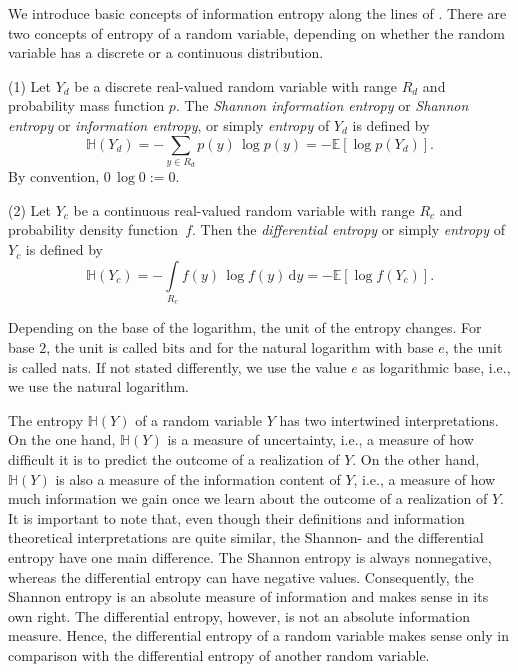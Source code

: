 \documentclass[smallextended]{svjour3}
\newcommand{\E}{\mathbb{E}}
\renewcommand{\H}{\mathbb{H}}
\newcommand{\suml}{\sum\limits}
\newcommand{\intl}{\int\limits}
\newcommand{\dd}[1]{\,\mathrm{d}#1}
\newcommand{\bits}{\mathrm{bits}}
\newcommand{\nats}{\mathrm{nats}}
\newcommand{\ie}{i.e.}
\newcommand{\pdf}{probability density function}
\begin{document}
We introduce basic concepts of information entropy along the lines of \citet{Cover2006}.
There are two concepts of entropy of a random variable, depending on whether the random variable has a discrete or a continuous distribution.
\begin{definition}%
\label{def:discrete_entropy}
	(1) Let $Y_d$ be a discrete real-valued random variable with range $R_d$ and probability mass function $p$.
	The \emph{Shannon information entropy} or \emph{Shannon entropy} or \emph{information entropy}, or simply \emph{entropy} of $Y_d$ is defined by
	\begin{equation*}
		\H(Y_d) = -\suml_{y\in R_d} p(y)\,\log p(y) = -\E\left[\log p(Y_d)\right].
	\end{equation*}
	By convention, $0\,\log 0:=0$.
	
	(2) Let $Y_c$ be a continuous real-valued random variable with range $R_c$ and \pdf\ $f$.
	Then the \emph{differential entropy} or simply \emph{entropy} of $Y_c$ is defined by
	\begin{equation*}
		\H(Y_c) = -\intl_{R_c} f(y)\,\log f(y)\dd{y} = -\E\left[\log f(Y_c)\right].
	\end{equation*}
\end{definition}

\begin{remark}
	Depending on the base of the logarithm, the unit of the entropy changes.
	For base $2$, the unit is called \emph{$\bits$} and for the natural logarithm with base $e$, the unit is called \emph{$\nats$}.
	If not stated differently, we use the value $e$ as logarithmic base, \ie, we use the natural logarithm.
\end{remark}

The entropy $\H(Y)$ of a random variable $Y$ has two intertwined interpretations.
On the one hand, $\H(Y)$ is a measure of uncertainty, \ie, a measure of how difficult it is to predict the outcome of a realization of $Y$.
On the other hand, $\H(Y)$ is also a measure of the information content of $Y$, \ie, a measure of how much information we gain once we learn about the outcome of a realization of $Y$.
It is important to note that, even though their definitions and information theoretical interpretations are quite similar, the Shannon- and the differential entropy have one main difference.
The Shannon entropy is always nonnegative, whereas the differential entropy can have negative values.
Consequently, the Shannon entropy is an absolute measure of information and makes sense in its own right.
The differential entropy, however, is not an absolute information measure.
Hence, the differential entropy of a random variable makes sense only in comparison with the differential entropy of another random variable.
\end{document}
